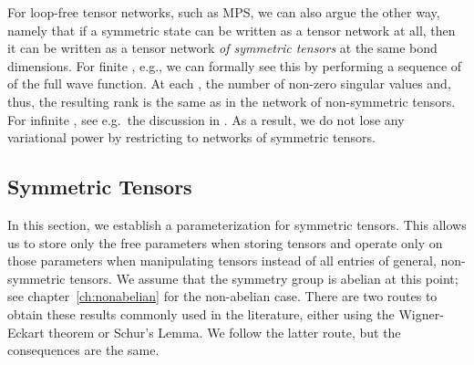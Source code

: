 For loop-free tensor networks, such as MPS, we can also argue the other way, namely that if a symmetric state can be written as a tensor network at all, then it can be written as a tensor network \emph{of symmetric tensors} at the same bond dimensions.
%
For finite , e.g., we can formally see this by performing a sequence of  of the full wave function.
%
At each , the number of non-zero singular values and, thus, the resulting rank is the same as in the network of non-symmetric tensors.
%
For infinite , see e.g.~the discussion in \cite[Sec. III.A.1]{cirac2021}.
%
As a result, we do not lose any variational power by restricting to networks of symmetric tensors.


\subsection{Symmetric Tensors}
In this section, we establish a parameterization for symmetric tensors.
%
This allows us to store only the free parameters when storing tensors and operate only on those parameters when manipulating tensors instead of all entries of general, non-symmetric tensors.
%
We assume that the symmetry group is abelian at this point; see chapter~\ref{ch:nonabelian} for the non-abelian case.
%
There are two routes to obtain these results commonly used in the literature, either using the Wigner-Eckart theorem or Schur's Lemma.
%
We follow the latter route, but the consequences are the same.

